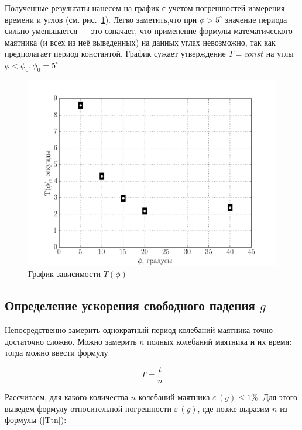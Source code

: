 \documentclass[a4paper,12pt]{article}
\begin{document}
Полученные результаты нанесем на график с учетом погрешностей измерения времени и углов (см. рис.\ \ref{fig1}). Легко заметить,что при $\phi>5^{\circ}$ значение периода сильно уменьшается  --- это означает, что применение формулы математического маятника (и всех из неё выведенных) на данных углах невозможно, так как предполагает период константой. График сужает утверждение $T=const$ на углы $\phi<\phi_0, \phi_0=5^{\circ}$
\newpage

\begin{figure}[h]
\begin{center}
\includegraphics*[width=1\textwidth]{img/phi_2.png}
\caption{\label{fig1}График зависимости $T(\phi)$}
\end{center}
\end{figure}



\subsection{Определение ускорения свободного падения ${g}$}
Непосредственно замерить однократный период колебаний маятника точно достаточно сложно. Можно замерить $n$ полных колебаний маятника и их время: тогда можно ввести формулу

\begin{equation}
\label{Ttn}
	T=\frac{t}{n}
\end{equation}

Рассчитаем, для какого количества $n$ колебаний маятника $\varepsilon\,(g)\le1\%$. Для этого выведем формулу относительной погрешности $\varepsilon\,(g)$, где позже выразим $n$ из формулы (\ref{Ttn}):
\end{document}
